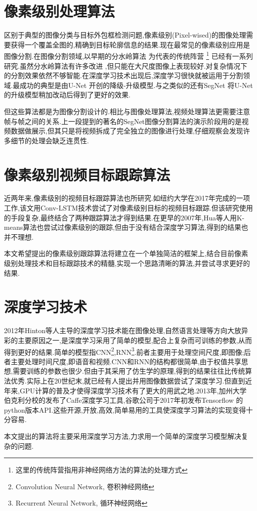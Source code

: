 \section{像素级别处理算法}
区别于典型的图像分类与目标外包框检测问题,像素级别(Pixel-wised)的图像处理需要获得一个覆盖全图的,精确到目标轮廓信息的结果.现在最常见的像素级别应用是图像分割.在图像分割领域,以早期的分水岭算法
\supercite{olsen1997multi}
为代表的传统阵营
\footnote{这里的传统阵营指用非神经网络方法的算法的处理方式}
已经有一系列研究.虽然分水岭算法有许多改进
\supercite{grau2004improved}
,但只能在大尺度图像上表现较好.对复杂情况下的分割效果依然不够智能.在深度学习技术出现后,深度学习很快就被运用于分割领域.最成功的典型是由U-Net
\supercite{ronneberger2015u}
开创的降级-升级模型.与之类似的还有SegNet
\supercite{badrinarayanan2017segnet}
将U-Net的升级模型稍加改动后得到了更好的效果.
\par
但这些算法都是为图像分割设计的.相比与图像处理算法,视频处理算法更需要注意帧与帧之间的关系.上一段提到的著名的SegNet图像分割算法的演示阶段用的是视频数据做展示,但其只是将视频拆成了完全独立的图像进行处理,仔细观察会发现许多细节的处理会缺乏连贯性.

\section{像素级别视频目标跟踪算法}
近两年来,像素级别的视频目标跟踪算法也所研究.如纽约大学在2017年完成的一项工作\supercite{DBLP:journals/corr/abs-1711-07377},该文用Conv-LSTM技术\supercite{PatrauceanHC16}尝试了对像素级别目标的视频目标跟踪.但该研究使用的手段复杂,最终结合了两种跟踪算法才得到结果.在更早的2007年,Hua等人用K-means算法也尝试过像素级别的跟踪\supercite{hua2008k},但由于没有结合深度学习算法,得到的结果也并不理想.
\par
本文希望提出的像素级别跟踪算法将建立在一个单独简洁的框架上,结合目前像素级别处理技术和目标跟踪技术的精髓,实现一个思路清晰的算法,并尝试寻求更好的结果.

\section{深度学习技术}
2012年Hinton等人主导的深度学习技术能在图像处理,自然语言处理等方向大放异彩的主要原因之一,是深度学习采用了简单的模型,配合上复杂而可训练的参数,从而得到更好的结果.简单的模型指CNN\footnote{Convolution Neural Network, 卷积神经网络},RNN\footnote{Recurrent Neural Network, 循环神经网络}.前者主要用于处理空间尺度,即图像;后者主要处理时间尺度,即语音和视频.CNN和RNN的结构都很简单,由于权值共享思想,需要训练的参数也很少.但由于其采用了仿生学的原理,得到的结果往往比传统算法优秀.实际上在20世纪末,就已经有人提出并用图像数据尝试了深度学习\supercite{lecun1998gradient}.但直到近年来,GPU计算的普及才使得深度学习技术有了更大的用武之地.2013年,加州大学伯克利分校的发布了Caffe\supercite{caffe}深度学习工具,谷歌公司于2017年初发布Tensorflow
\supercite{abadi2016tensorflow}的python版本API.这些开源,开放,高效,简单易用的工具使深度学习算法的实现变得十分容易.
\par
本文提出的算法将主要采用深度学习方法,力求用一个简单的深度学习模型解决复杂的问题.

